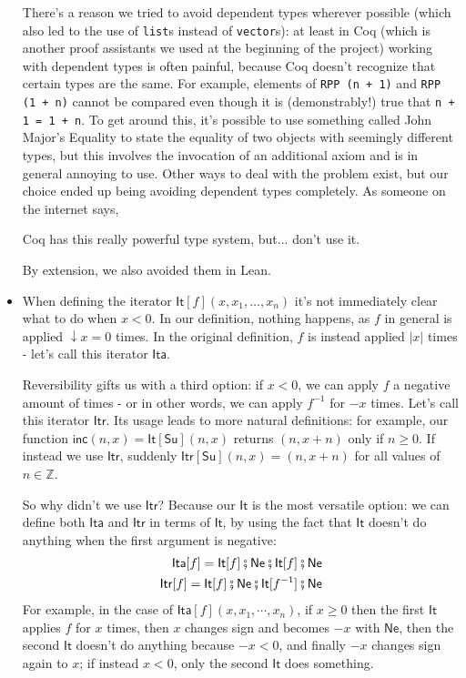 \documentclass{book}
\theoremstyle{definition}
\theoremstyle{remark}
\theoremstyle{plain}
\newcommand{\ZZ}{\mathbb{Z}}
\newcommand{\rppNe}{\mathsf{Ne}}
\newcommand{\rppSu}{\mathsf{Su}}
\newcommand{\rppCo}{\fatsemi}
\newcommand{\rppIt}{\mathsf{It}}
\newcommand{\rppIta}{\mathsf{Ita}}
\newcommand{\rppItr}{\mathsf{Itr}}
\newcommand{\rppinc}{\mathsf{inc}}
\begin{document}
\begin{itemize}
There's a reason we tried to avoid dependent types wherever possible
(which also led to the use of \lstinline{list}s instead of \lstinline{vector}s):
at least in Coq (which is another proof assistants we used at the beginning of the project)
working with dependent types is often painful, because Coq doesn't recognize that certain types are the same.
For example, elements of \lstinline{RPP (n + 1)} and \lstinline{RPP (1 + n)} cannot be compared even though it is (demonstrably!) true that
\lstinline{n + 1 = 1 + n}. To get around this, it's possible to use something called John Major's Equality
to state the equality of two objects with seemingly different types,
but this involves the invocation of an additional axiom and is in general annoying to use.
Other ways to deal with the problem exist,
but our choice ended up being avoiding dependent types completely.
As someone on the internet says,
\begin{displayquote}
Coq has this really powerful type system, but... don't use it.
\end{displayquote}
By extension, we also avoided them in Lean.
\item When defining the iterator $\rppIt[f] (x, x_1, \dots, x_n)$ it's not immediately clear what to do when $x < 0$.
In our definition, nothing happens, as $f$ in general is applied $\downarrow x = 0$ times.
In the original definition, $f$ is instead applied $| x |$ times - let's call this iterator $\rppIta$.

Reversibility gifts us with a third option: if $x < 0$,
we can apply $f$ a negative amount of times - or in other words, we can apply $f^{-1}$ for $- x$ times.
Let's call this iterator $\rppItr$.
Its usage leads to more natural definitions:
for example, our function $\rppinc (n, x) = \rppIt[\rppSu] (n, x)$ returns $(n, x+n)$ only if $n \ge 0$.
If instead we use $\rppItr$, suddenly $\rppItr[\rppSu] (n, x) = (n, x + n)$ for all values of $n \in \ZZ$.

So why didn't we use $\rppItr$?
Because our $\rppIt$ is the most versatile option:
we can define both $\rppIta$ and $\rppItr$ in terms of $\rppIt$,
by using the fact that $\rppIt$ doesn't do anything when the first argument is negative:
\begin{align*}
  \rppIta[f] = \rppIt[f] \rppCo \rppNe \rppCo \rppIt[f] \rppCo \rppNe \\
  \rppItr[f] = \rppIt[f] \rppCo \rppNe \rppCo \rppIt[f^{-1}] \rppCo \rppNe
\end{align*}
For example, in the case of $\rppIta[f](x,x_1,\cdots,x_n)$, if $x \ge 0$ then the first $\rppIt$ applies $f$ for $x$ times,
then $x$ changes sign and becomes $-x$ with $\rppNe$, then the second $\rppIt$ doesn't do anything because $- x < 0$,
and finally $-x$ changes sign again to $x$; if instead $x < 0$, only the second $\rppIt$ does something.


\end{itemize}
\end{document}
